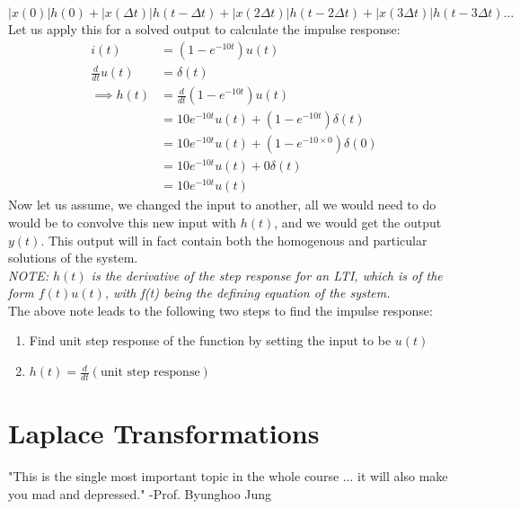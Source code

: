 \documentclass[nobib]{tufte-handout}
\begin{document}
\begin{equation*}
    |x(0)|h(0)+|x(\Delta t)|h(t-\Delta t)+|x(2\Delta t)|h(t-2\Delta t)+|x(3\Delta t)|h(t-3\Delta t)\ldots
\end{equation*}
Let us apply this for a solved output to calculate the impulse response:
\begin{align*}
    i(t)             & = (1-e^{-10t})u(t)                              \\
    \frac{d}{dt}u(t) & = \delta(t)                                     \\
    \implies h(t)    & = \frac{d}{dt}(1-e^{-10t})u(t)                  \\
                     & = 10e^{-10t}u(t)+(1-e^{-10t})\delta(t)          \\
                     & = 10e^{-10t}u(t) + (1-e^{-10\times 0})\delta(0) \\
                     & = 10e^{-10t}u(t)+0\delta(t)                     \\
                     & = 10e^{-10t}u(t)
\end{align*}
Now let us assume, we changed the input to another, all we would need to do would be to convolve this new input with $h(t)$, and we would get the output $y(t)$. This output will in fact contain both the homogenous and particular solutions of the system.\\
\textit{NOTE: $h(t)$ is the derivative of the step response for an LTI, which is of the form $f(t)u(t)$, with f(t) being the defining equation of the system.}\\
The above note leads to the following two steps to find the impulse response:
\begin{enumerate}
    \item Find unit step response of the function by setting the input to be $u(t)$
    \item $h(t) = \frac{d}{dt}(\text{unit step response})$
\end{enumerate}
\section{Laplace Transformations}
\begin{center}
    "This is the single most important topic in the whole course ... it will also make you mad and depressed." -Prof. Byunghoo Jung
\end{center}
\end{document}
